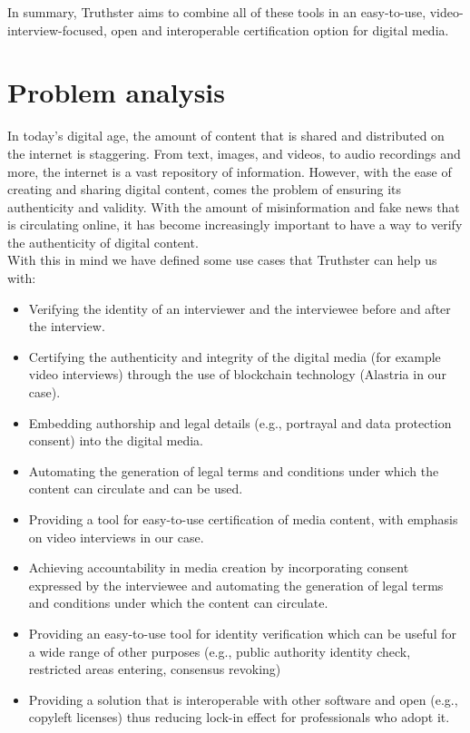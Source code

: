 \documentclass[target=mst,aauheader=]{thud}
\begin{document}
In summary, Truthster aims to combine all of these tools in an easy-to-use, video-interview-focused, open and interoperable certification option for digital media.





\chapter{Problem analysis}

In today's digital age, the amount of content that is shared and distributed on the internet is staggering. From text, images, and videos, to audio recordings and more, the internet is a vast repository of information. However, with the ease of creating and sharing digital content, comes the problem of ensuring its authenticity and validity. With the amount of misinformation and fake news that is circulating online, it has become increasingly important to have a way to verify the authenticity of digital content.\\

With this in mind we have defined some use cases that Truthster can help us with:

\begin{itemize}

    \item Verifying the identity of an interviewer and the interviewee before and after the interview.
    \item Certifying the authenticity and integrity of the digital media (for example video interviews) through the use of blockchain technology (Alastria in our case).
    \item Embedding authorship and legal details (e.g., portrayal and data protection consent) into the digital media.
    \item Automating the generation of legal terms and conditions under which the content can circulate and can be used.
    \item Providing a tool for easy-to-use certification of media content, with emphasis on video interviews in our case.
    \item Achieving accountability in media creation by incorporating consent expressed by the interviewee and automating the generation of legal terms and conditions under which the content can circulate.
    \item Providing an easy-to-use tool for identity verification which can be useful for a wide range of other purposes (e.g., public authority identity check, restricted areas entering, consensus revoking)
    \item Providing a solution that is interoperable with other software and open (e.g., copyleft licenses) thus reducing lock-in effect for professionals who adopt it.
    
\end{itemize}
\end{document}
